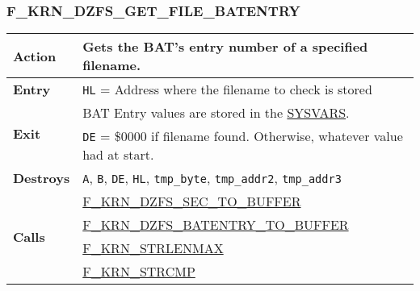     \subsubsection{F\_KRN\_DZFS\_GET\_FILE\_BATENTRY}
    \label{func:fkrndzfsgetfilebatentry}
    \begin{tabular}{l p{9cm}}
        \hline\textbf{Action}
        & Gets the BAT's entry number of a specified filename.\\
        \hline\textbf{Entry} & \texttt{HL} = Address where the filename to 
        check is stored\\
        \hline\multirow[t]{2}{4em}{\textbf{Exit}}
        & BAT Entry values are stored in the \hyperref[sec:ram_memmap]{SYSVARS}.\\
        & \texttt{DE} = \$0000 if filename found. Otherwise, whatever value
        had at start.\\
        \hline\textbf{Destroys} & \texttt{A}, \texttt{B}, \texttt{DE}, \texttt{HL},
        \texttt{tmp\_byte}, \texttt{tmp\_addr2}, \texttt{tmp\_addr3} \\
        \hline\multirow[t]{4}{4em}{\textbf{Calls}}
        & \hyperref[func:fkrndzfssectobuffer]{F\_KRN\_DZFS\_SEC\_TO\_BUFFER}\\
        & \hyperref[func:fkrndzfsbatentrytobuffer]{F\_KRN\_DZFS\_BATENTRY\_TO\_BUFFER}\\
        & \hyperref[func:fkrnstrlenmax]{F\_KRN\_STRLENMAX}\\
        & \hyperref[func:fkrnstrcmp]{F\_KRN\_STRCMP}\\
        \hline
    \end{tabular}

